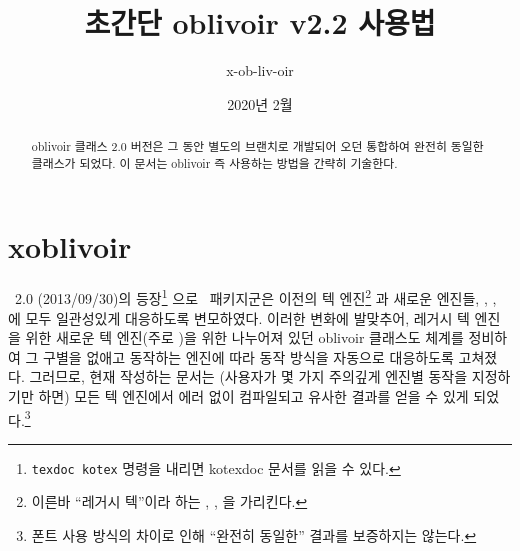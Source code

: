 \documentclass[
	12pt,
	a4paper,
	kosection,
	footnote,
	nobookmarks,
	microtype,
]{oblivoir}
\newcommand\xobclass{x\-ob\-liv\-oir\oblivoirallowbreak}
\newcommand\obclass{ob\-liv\-oir\oblivoirallowbreak}
\begin{document}
\title{초간단 \obclass{} v2.2 사용법}

\date{2020년 2월}

\author{x-ob-liv-oir }

\maketitle

\begin{abstract}
\obclass{} 클래스 2.0 버전은 그 동안 별도의 브랜치로 개발되어 오던
  통합하여 완전히 동일한 클래스가 되었다.
이 문서는 \obclass{} 즉 
사용하는 방법을 간략히 기술한다.
\end{abstract}

\tableofcontents*

\clearpage

\section{ \xobclass{}}


\koTeX\ 2.0 (2013/09/30)의 등장\footnote{%
	\texttt{texdoc kotex} 명령을 내리면 kotexdoc 문서를 읽을 수 있다.}%
으로 \koTeX\ 패키지군은 이전의 텍 엔진\footnote{%
	이른바 ``레거시 텍''이라 하는 , , 을
	가리킨다.}%
과 새로운 엔진들, , ,
에 모두 일관성있게 대응하도록 변모하였다.
이러한 변화에 발맞추어, 레거시 텍 엔진을 위한  새로운 텍 엔진(주로 )을 위한 
나누어져 있던 oblivoir 클래스도 체계를 정비하여 그 구별을 없애고 동작하는 엔진에 따라 동작 방식을
자동으로 대응하도록 고쳐졌다. 그러므로, 현재  작성하는 문서는 
(사용자가 몇 가지 주의깊게 엔진별 동작을 지정하기만 하면) 모든 텍 엔진에서 에러 없이 컴파일되고
유사한 결과를 얻을 수 있게 되었다.\footnote{%
	폰트 사용 방식의 차이로 인해 ``완전히 동일한'' 결과를 보증하지는 않는다.}
\end{document}
